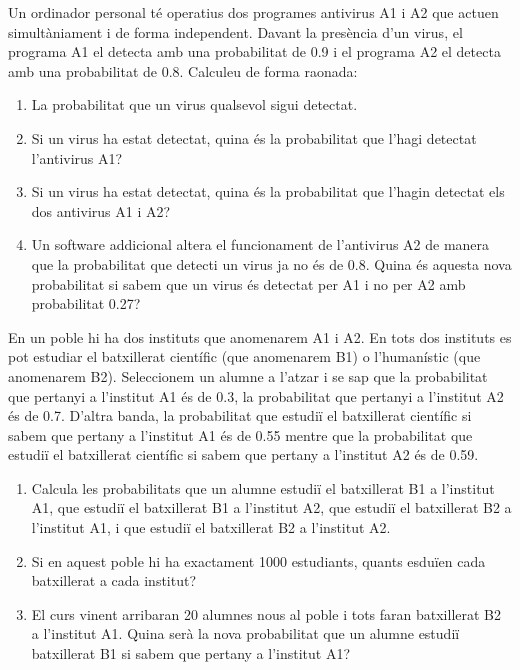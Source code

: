
\item Un ordinador personal té operatius dos programes antivirus A1 i A2 que actuen simultàniament i de forma independent. Davant la presència d'un virus, el programa A1 el detecta amb una probabilitat de 0.9 i el programa A2 el detecta amb una probabilitat de 0.8. Calculeu de forma raonada:
\begin{enumerate}
    \item La probabilitat que un virus qualsevol sigui detectat.
    \item  Si un virus ha estat detectat, quina és la probabilitat que l'hagi detectat l'antivirus A1?
    \item Si un virus ha estat detectat, quina és la probabilitat que l'hagin detectat els dos antivirus A1 i A2?
    \item Un software addicional altera el funcionament de l'antivirus A2 de manera que la probabilitat que detecti un virus ja no és de 0.8. Quina és aquesta nova probabilitat si sabem que un virus és detectat per A1 i no per A2 amb probabilitat 0.27?
\end{enumerate}


\item En un poble hi ha dos instituts que anomenarem A1 i A2. En tots dos instituts es pot estudiar el batxillerat científic (que anomenarem B1) o l'humanístic (que anomenarem B2). Seleccionem un alumne a l'atzar i se sap que la probabilitat que pertanyi a l'institut A1 és de 0.3, la probabilitat que pertanyi a l'institut A2 és de 0.7. D'altra banda, la probabilitat que estudiï el batxillerat científic si sabem que pertany a l'institut A1 és de 0.55 mentre que la probabilitat que estudiï el batxillerat científic si sabem que pertany a l'institut A2 és de 0.59.
 \begin{enumerate}
    \item Calcula les probabilitats que un alumne estudiï el batxillerat B1 a l'institut A1, que estudiï el batxillerat B1 a l'institut A2, que estudiï el batxillerat B2 a l'institut A1, i que estudiï el batxillerat B2 a l'institut A2.
    \item Si en aquest poble hi ha exactament 1000 estudiants, quants esduïen cada batxillerat a cada institut?
    \item El curs vinent arribaran 20 alumnes nous al poble i tots faran batxillerat B2 a l'institut A1. Quina serà la nova probabilitat que un alumne estudiï batxillerat B1 si sabem que pertany a l'institut A1?
\end{enumerate}

